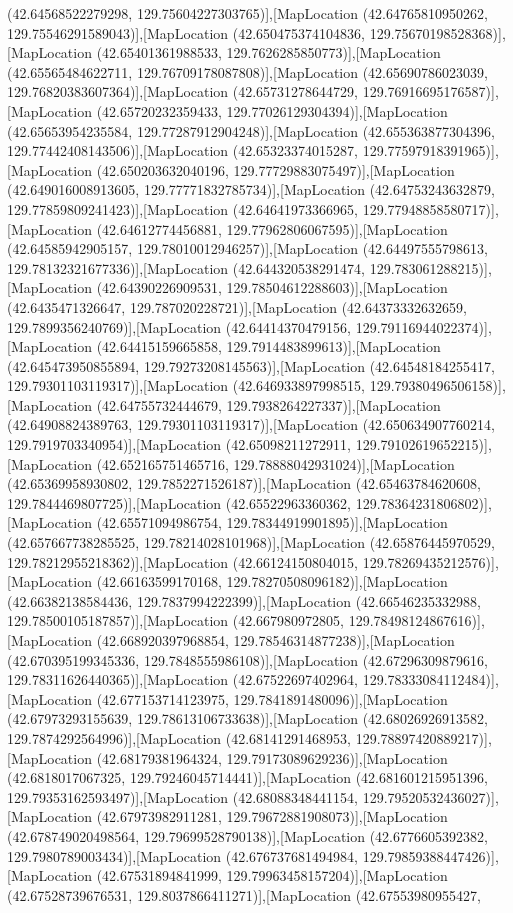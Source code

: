 (42.64568522279298, 129.75604227303765)],[MapLocation (42.64765810950262, 129.75546291589043)],[MapLocation (42.650475374104836, 129.75670198528368)],[MapLocation (42.65401361988533, 129.7626285850773)],[MapLocation (42.65565484622711, 129.76709178087808)],[MapLocation (42.65690786023039, 129.76820383607364)],[MapLocation (42.65731278644729, 129.76916695176587)],[MapLocation (42.65720232359433, 129.77026129304394)],[MapLocation (42.65653954235584, 129.77287912904248)],[MapLocation (42.655363877304396, 129.77442408143506)],[MapLocation (42.65323374015287, 129.77597918391965)],[MapLocation (42.650203632040196, 129.77729883075497)],[MapLocation (42.649016008913605, 129.77771832785734)],[MapLocation (42.64753243632879, 129.77859809241423)],[MapLocation (42.64641973366965, 129.77948858580717)],[MapLocation (42.64612774456881, 129.77962806067595)],[MapLocation (42.64585942905157, 129.78010012946257)],[MapLocation (42.64497555798613, 129.78132321677336)],[MapLocation (42.644320538291474, 129.783061288215)],[MapLocation (42.64390226909531, 129.78504612288603)],[MapLocation (42.6435471326647, 129.787020228721)],[MapLocation (42.64373332632659, 129.7899356240769)],[MapLocation (42.64414370479156, 129.79116944022374)],[MapLocation (42.64415159665858, 129.7914483899613)],[MapLocation (42.645473950855894, 129.79273208145563)],[MapLocation (42.64548184255417, 129.79301103119317)],[MapLocation (42.646933897998515, 129.79380496506158)],[MapLocation (42.64755732444679, 129.7938264227337)],[MapLocation (42.64908824389763, 129.79301103119317)],[MapLocation (42.650634907760214, 129.7919703340954)],[MapLocation (42.65098211272911, 129.79102619652215)],[MapLocation (42.652165751465716, 129.78888042931024)],[MapLocation (42.65369958930802, 129.7852271526187)],[MapLocation (42.65463784620608, 129.7844469807725)],[MapLocation (42.65522963360362, 129.78364231806802)],[MapLocation (42.65571094986754, 129.78344919901895)],[MapLocation (42.657667738285525, 129.78214028101968)],[MapLocation (42.65876445970529, 129.78212955218362)],[MapLocation (42.66124150804015, 129.78269435212576)],[MapLocation (42.66163599170168, 129.78270508096182)],[MapLocation (42.66382138584436, 129.7837994222399)],[MapLocation (42.66546235332988, 129.78500105187857)],[MapLocation (42.667980972805, 129.78498124867616)],[MapLocation (42.668920397968854, 129.78546314877238)],[MapLocation (42.670395199345336, 129.7848555986108)],[MapLocation (42.67296309879616, 129.78311626440365)],[MapLocation (42.67522697402964, 129.78333084112484)],[MapLocation (42.677153714123975, 129.7841891480096)],[MapLocation (42.67973293155639, 129.78613106733638)],[MapLocation (42.68026926913582, 129.7874292564996)],[MapLocation (42.68141291468953, 129.78897420889217)],[MapLocation (42.68179381964324, 129.79173089629236)],[MapLocation (42.6818017067325, 129.79246045714441)],[MapLocation (42.681601215951396, 129.79353162593497)],[MapLocation (42.68088348441154, 129.79520532436027)],[MapLocation (42.67973982911281, 129.79672881908073)],[MapLocation (42.678749020498564, 129.79699528790138)],[MapLocation (42.6776605392382, 129.7980789003434)],[MapLocation (42.676737681494984, 129.79859388447426)],[MapLocation (42.67531894841999, 129.79963458157204)],[MapLocation (42.67528739676531, 129.8037866411271)],[MapLocation (42.67553980955427, 
